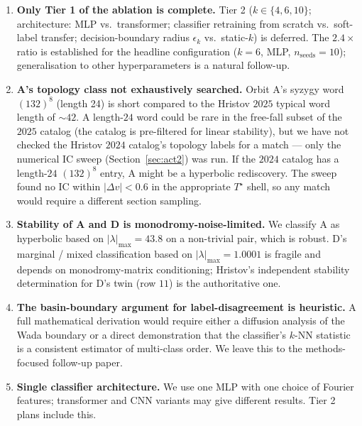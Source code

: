 \documentclass[11pt]{article}
\newcommand{\Tstar}{T^{\star}}
\begin{document}
\begin{enumerate}[leftmargin=1.5em]
  \item \textbf{Only Tier 1 of the ablation is complete.} Tier 2
    ($k \in \{4, 6, 10\}$; architecture: MLP vs.\ transformer;
    classifier retraining from scratch vs.\ soft-label transfer;
    decision-boundary radius $\epsilon_k$ vs.\ static-$k$) is
    deferred. The $2.4\times$ ratio is established for the headline
    configuration ($k=6$, MLP, $n_{\text{seeds}}=10$); generalisation
    to other hyperparameters is a natural follow-up.
  \item \textbf{A's topology class not exhaustively searched.}
    Orbit A's syzygy word $(132)^8$ (length 24) is short compared to
    the Hristov $2025$ typical word length of $\sim\!42$. A
    length-$24$ word could be rare in the free-fall subset of
    the $2025$ catalog (the catalog is pre-filtered for linear
    stability), but we have not checked the Hristov $2024$
    catalog's topology labels for a match --- only the numerical
    IC sweep (Section~\ref{sec:act2}) was run. If the $2024$
    catalog has a length-$24$ $(132)^8$ entry, A might be a
    hyperbolic rediscovery. The sweep found no IC within
    $|\Delta v|<0.6$ in the appropriate $\Tstar$ shell, so any
    match would require a different section sampling.
  \item \textbf{Stability of A and D is monodromy-noise-limited.}
    We classify A as hyperbolic based on $|\lambda|_{\max}=43.8$ on a
    non-trivial pair, which is robust. D's marginal / mixed
    classification based on $|\lambda|_{\max}=1.0001$ is fragile
    and depends on monodromy-matrix conditioning; Hristov's
    independent stability determination for D's twin (row $11$) is
    the authoritative one.
  \item \textbf{The basin-boundary argument for
    label-disagreement is heuristic.} A full mathematical derivation
    would require either a diffusion analysis of the Wada boundary
    or a direct demonstration that the classifier's $k$-NN
    statistic is a consistent estimator of multi-class order. We
    leave this to the methods-focused follow-up paper.
  \item \textbf{Single classifier architecture.} We use one MLP
    with one choice of Fourier features; transformer and CNN
    variants may give different results. Tier 2 plans include this.
\end{enumerate}

\end{document}
